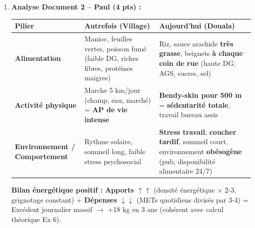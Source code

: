 \documentclass[11pt]{article}
\begin{document}
\begin{corrige}
\begin{enumerate}
\item \textbf{Analyse Document 2 -- Paul (4 pts) :}
\begin{center}
\begin{tabularx}{\linewidth}{|l|X|X|}\hline
\textbf{Pilier} & \textbf{Autrefois (Village)} & \textbf{Aujourd'hui (Douala)} \\ \hline
\textbf{Alimentation} & Manioc, feuilles vertes, poisson fumé (faible DG, riches fibres, protéines maigres) & Riz, sauce arachide \textbf{très grasse}, beignets \textbf{à chaque coin de rue} (haute DG, AGS, sucres, sel) \\ \hline
\textbf{Activité physique} & Marche 5 km/jour (champ, eau, marché) = \textbf{AP de vie intense} & \textbf{Bendy-skin pour 500 m} = \textbf{sédentarité totale}, travail bureau assis \\ \hline
\textbf{Environnement / Comportement} & Rythme solaire, sommeil long, faible stress psychosocial & \textbf{Stress travail}, \textbf{coucher tardif}, sommeil court, environnement \textbf{obésogène} (pub, disponibilité alimentaire 24/7) \\ \hline
\end{tabularx}
\end{center}
\textbf{Bilan énergétique positif :} \textbf{Apports $\uparrow\uparrow$} (densité énergétique $\times$ 2-3, grignotage constant) + \textbf{Dépenses $\downarrow\downarrow$} (METs quotidiens divisés par 3-4) = Excédent journalier massif $\rightarrow$ +18 kg en 3 ans (cohérent avec calcul théorique Ex 6).


\end{enumerate}
\end{corrige}
\end{document}
